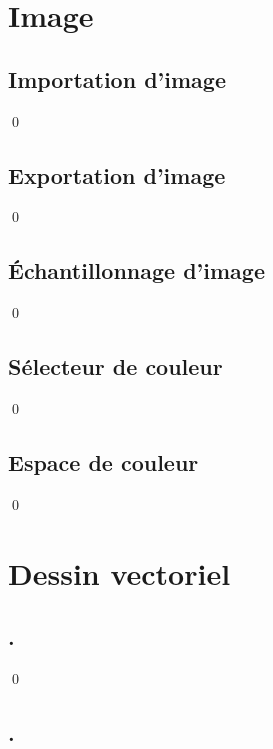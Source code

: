 \documentclass[12pt]{article}
\newcommand{\state}{\noindent}
\begin{document}
\pagebreak

\section{Image}

\subsection{Importation d'image}

\state

\qed

\subsection{Exportation d'image}

\state

\qed

\subsection{Échantillonnage d'image}

\state

\qed

\subsection{Sélecteur de couleur}

\state

\qed

\subsection{Espace de couleur}

\state

\qed

\pagebreak

\section{Dessin vectoriel}

\subsection{.}

\state

\qed

\subsection{.}
\end{document}
